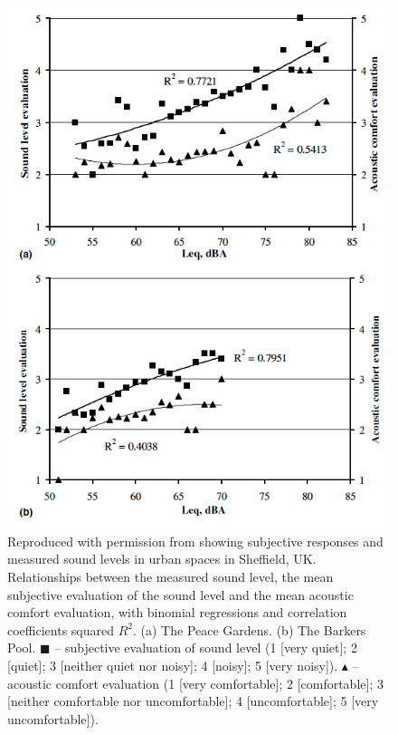 \begin{figure}
  \centering
  \includegraphics[width=.65\textwidth]{Figures/YangKang2005 Acoustic Comfort dB.png}
  \caption[Subjective responses and measured sound levels in urban spaces in Sheffield, UK.]{Reproduced with permission from \citep[Fig. 2]{Yang2005Acoustic} showing subjective responses and measured sound levels in urban spaces in Sheffield, UK. Relationships between the measured sound level, the mean subjective evaluation of the sound level and the mean acoustic comfort evaluation, with binomial regressions and correlation coefficients squared $R^2$. (a) The Peace Gardens. (b) The Barkers Pool. $\blacksquare$ -- subjective evaluation of sound level (1 [very quiet]; 2 [quiet]; 3 [neither quiet nor noisy]; 4 [noisy]; 5 [very noisy]). $\blacktriangle$ -- acoustic comfort evaluation (1 [very comfortable]; 2 [comfortable]; 3 [neither comfortable nor uncomfortable]; 4 [uncomfortable]; 5 [very uncomfortable]). \label{fig:yang2005acousticComfort} }
\end{figure}


